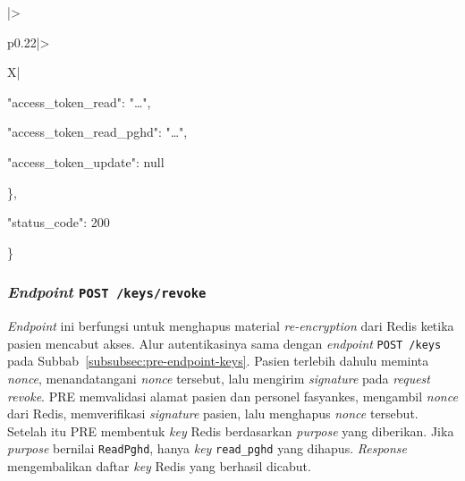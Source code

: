 \begin{styledxltabular}{|>{\raggedright\arraybackslash}p{0.22\textwidth}|>{\raggedright\arraybackslash}X|}
\hspace*{2.0em}"access\_token\_read": "\ldots",\par
\hspace*{2.0em}"access\_token\_read\_pghd": "\ldots",\par
\hspace*{2.0em}"access\_token\_update": null\par
\hspace*{1.0em}\},\par
\hspace*{1.0em}"status\_code": 200\par
\}
\endgroup \\
    \hline
\end{styledxltabular}


\subsubsection{\textit{Endpoint} \texttt{POST /keys/revoke}}\label{subsubsec:pre-endpoint-keys-revoke}

\textit{Endpoint} ini berfungsi untuk menghapus material \textit{re-encryption} dari Redis ketika pasien mencabut akses. 
Alur autentikasinya sama dengan \textit{endpoint} \texttt{POST /keys} pada Subbab~\ref{subsubsec:pre-endpoint-keys}. 
Pasien terlebih dahulu meminta \textit{nonce}, menandatangani \textit{nonce} tersebut, lalu mengirim \textit{signature} pada \textit{request} \textit{revoke}. 
PRE memvalidasi alamat pasien dan personel fasyankes, mengambil \textit{nonce} dari Redis, memverifikasi \textit{signature} pasien, lalu menghapus \textit{nonce} tersebut. 
Setelah itu PRE membentuk \textit{key} Redis berdasarkan \textit{purpose} yang diberikan. 
Jika \textit{purpose} bernilai \texttt{ReadPghd}, hanya \textit{key} \texttt{read\_pghd} yang dihapus. 
\textit{Response} mengembalikan daftar \textit{key} Redis yang berhasil dicabut.

